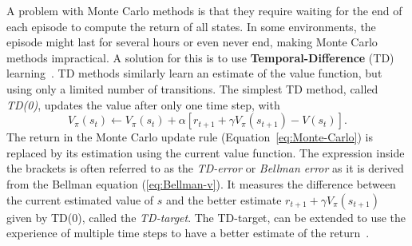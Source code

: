 A problem with Monte Carlo methods is that they require waiting for the end of each episode to compute the return of all states. In some environments, the episode might last for several hours or even never end, making Monte Carlo methods impractical. A solution for this is to use \textbf{Temporal-Difference} (TD) learning~\citep{Sutton1988_TD}. TD methods similarly learn an estimate of the value function, but using only a limited number of transitions. The simplest TD method, called \textit{TD(0)}, updates the value after only one time step, with
\begin{equation}
    V_\pi(s_t)\leftarrow V_\pi(s_t)+\alpha\left[r_{t+1}+\gamma V_\pi(s_{t+1})-V(s_t)\right].
    \label{eq:TD}
\end{equation}
The return in the Monte Carlo update rule (Equation~\ref{eq:Monte-Carlo}) is replaced by its estimation using the current value function. The expression inside the brackets is often referred to as the \textit{TD-error} or \textit{Bellman error} as it is derived from the Bellman equation (\ref{eq:Bellman-v}). It measures the difference between the current estimated value of $s$ and the better estimate $r_{t+1}+\gamma V_\pi(s_{t+1})$ given by TD(0), called the \textit{TD-target}. The TD-target, can be extended to use the experience of multiple time steps to have a better estimate of the return~\citep{Sutton1988_TD}. 


